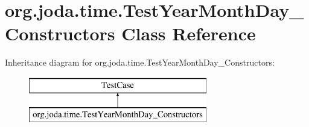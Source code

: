 \hypertarget{classorg_1_1joda_1_1time_1_1_test_year_month_day___constructors}{\section{org.\-joda.\-time.\-Test\-Year\-Month\-Day\-\_\-\-Constructors Class Reference}
\label{classorg_1_1joda_1_1time_1_1_test_year_month_day___constructors}
}
Inheritance diagram for org.\-joda.\-time.\-Test\-Year\-Month\-Day\-\_\-\-Constructors\-:\begin{figure}[H]
\begin{center}
\leavevmode
\includegraphics[height=2.000000cm]{classorg_1_1joda_1_1time_1_1_test_year_month_day___constructors}
\end{center}
\end{figure}
